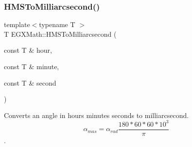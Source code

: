 \subsubsection{\texorpdfstring{H\+M\+S\+To\+Milliarcsecond()}{HMSToMilliarcsecond()}}
{\footnotesize\ttfamily template$<$typename T $>$ \\
T E\+G\+X\+Math\+::\+H\+M\+S\+To\+Milliarcsecond (\begin{DoxyParamCaption}\item[{const T \&}]{hour,  }\item[{const T \&}]{minute,  }\item[{const T \&}]{second }\end{DoxyParamCaption})}



Converts an angle in hours minutes seconds to milliarcsecond. \[\alpha_{mas}=\alpha_{rad}\frac{180 * 60 * 60 * 10^3}{\pi}\]. 

